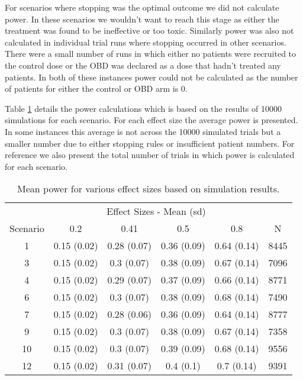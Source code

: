 For scenarios where stopping was the optimal outcome we did not calculate power. In these scenarios we wouldn't want to reach this stage as either the treatment was found to be ineffective or too toxic. Similarly power was also not calculated in individual trial runs where stopping occurred in other scenarios. There were a small number of runs in which either no patients were recruited to the control dose or the OBD was declared as a dose that hadn't treated any patients. In both of these instances power could not be calculated as the number of patients for either the control or OBD arm is 0. 
 
Table \ref{tab_wt:Power-Calcs} details the power calculations which is based on the results of 10000 simulations for each scenario. For each effect size the average power is presented. In some instances this average is not across the 10000 simulated trials but a smaller number due to either stopping rules or insufficient patient numbers. For reference we also present the total number of trials in which power is calculated for each scenario. 

\begin{table}[h!]
	
	\caption{\label{tab_wt:Power-Calcs}Mean power for various effect sizes based on simulation results.}
	\centering
	\begin{tabular}[t]{cccccc}
		\toprule
		\multicolumn{1}{c}{ } & \multicolumn{4}{c}{Effect Sizes - Mean (sd)} & \multicolumn{1}{c}{ } \\
		\cmidrule(l{3pt}r{3pt}){2-5}
		Scenario & 0.2 & 0.41 & 0.5 & 0.8 & N\\
		\midrule
		1 & 0.15 (0.02) & 0.28 (0.07) & 0.36 (0.09) & 0.64 (0.14) & 8445\\
		3 & 0.15 (0.02) & 0.3 (0.07) & 0.38 (0.09) & 0.67 (0.14) & 7096\\
		4 & 0.15 (0.02) & 0.29 (0.07) & 0.37 (0.09) & 0.66 (0.14) & 8771\\
		6 & 0.15 (0.02) & 0.3 (0.07) & 0.38 (0.09) & 0.68 (0.14) & 7490\\
		7 & 0.15 (0.02) & 0.28 (0.06) & 0.36 (0.09) & 0.64 (0.14) & 8777\\
		9 & 0.15 (0.02) & 0.3 (0.07) & 0.38 (0.09) & 0.67 (0.14) & 7358\\
		10 & 0.15 (0.02) & 0.3 (0.07) & 0.39 (0.09) & 0.68 (0.14) & 9556\\
		12 & 0.15 (0.02) & 0.31 (0.07) & 0.4 (0.1) & 0.7 (0.14) & 9391\\
		\bottomrule
	\end{tabular}
\end{table}



